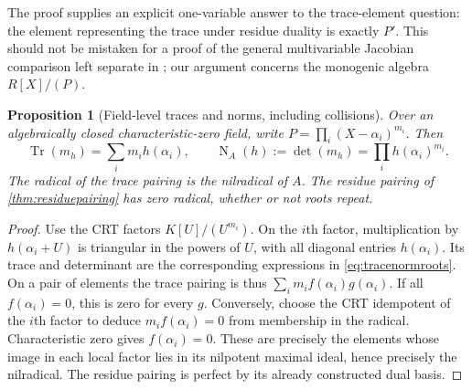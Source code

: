 \documentclass[11pt,letterpaper]{article}
\numberwithin{equation}{section}
\newtheorem{proposition}[proposition]{Proposition}
\theoremstyle{definition}
\theoremstyle{remark}
\newcommand{\Tr}{\operatorname{Tr}}
\newcommand{\Nm}{\operatorname{N}}
\begin{document}
The proof supplies an explicit one-variable answer to the trace-element
question: the element representing the trace under residue duality is
exactly $P'$. This should not be mistaken for a proof of the general
multivariable Jacobian comparison left separate in
\cite{SourceResearch}; our argument concerns the monogenic algebra
$R[X]/(P)$.

\begin{proposition}[Field-level traces and norms, including collisions]\label{prop:tracenormroots}
Over an algebraically closed characteristic-zero field, write
$P=\prod_i(X-\alpha_i)^{m_i}$. Then
\begin{equation}\label{eq:tracenormroots}
 \Tr(m_h)=\sum_i m_i h(\alpha_i),\qquad
 \Nm_A(h):=\det(m_h)=\prod_i h(\alpha_i)^{m_i}.
\end{equation}
The radical of the trace pairing is the nilradical of $A$. The residue
pairing of \cref{thm:residuepairing} has zero radical, whether or not roots
repeat.
\end{proposition}
\begin{proof}
Use the CRT factors $K[U]/(U^{m_i})$. On the $i$th factor, multiplication
by $h(\alpha_i+U)$ is triangular in the powers of $U$, with all diagonal
entries $h(\alpha_i)$. Its trace and determinant are the corresponding
expressions in \eqref{eq:tracenormroots}. On a pair of elements the trace
pairing is thus $\sum_i m_i f(\alpha_i)g(\alpha_i)$.
If all $f(\alpha_i)=0$, this is zero for every $g$. Conversely, choose the
CRT idempotent of the $i$th factor to deduce $m_i f(\alpha_i)=0$ from
membership in the radical. Characteristic zero gives $f(\alpha_i)=0$.
These are precisely the elements whose image in each local factor lies
in its nilpotent maximal ideal, hence precisely the nilradical. The
residue pairing is perfect by its already constructed dual basis.
\end{proof}
\end{document}
